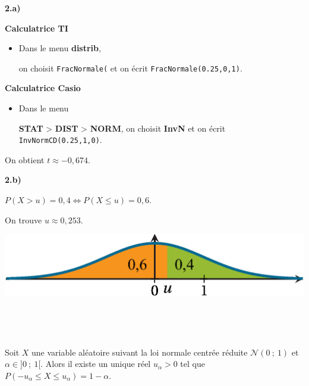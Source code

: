 \documentclass{cornouaille}
\begin{document}
\begin{methode}
\textbf{2.a) } 

\textcolor{H1}{\bfseries Calculatrice TI}

\begin{itemize}
\item \raggedright
Dans le menu
\textbf{distrib}, 


on choisit \verb"FracNormale(" et on écrit \verb"FracNormale(0.25,0,1)".
\end{itemize}


\columnbreak

\textcolor{H1}{\bfseries Calculatrice Casio}

\begin{itemize}
\item \raggedright Dans le menu 



\textbf{STAT} > \textbf{DIST} > \textbf{NORM}, on choisit
\textbf{InvN} et on écrit \verb"InvNormCD(0.25,1,0)".
\end{itemize}



On obtient $t\approx -0,674$.


\textbf{2.b) } ~~


\begin{minipage}{0.6\linewidth}
$P(X>u)=0,4 \Leftrightarrow P(X\leqslant u)=0,6$.

On trouve $u\approx 0,253$.
\end{minipage}

\hfill

\begin{minipage}{0.4\linewidth}



\includegraphics{./TS-Variables-8}



\end{minipage}






~~



~~
\end{methode}




\begin{theoreme}
Soit $X$ une variable aléatoire suivant la loi normale centrée réduite $\mathcal{N}(0\ ;\ 1)$ et $\alpha\in ]0\ ;\ 1[$. Alors il existe un unique réel $u_{\alpha}>0$ tel que $P(-u_{\alpha}\leqslant X\leqslant u_{\alpha})=1-\alpha$.
\end{theoreme}
\end{document}

